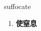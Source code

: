 
\begin{frame}
{\huge suffocate}
\begin{center}
\begin{enumerate}\Large
  \item \textbf{使窒息}
\end{enumerate}
\end{center}
\end{frame}
